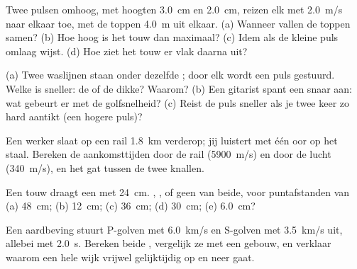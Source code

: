 \begin{exercise}[$\star\star$]\label{exo:g12:mechanical-waves:7}
Twee pulsen omhoog, met hoogten \qty{3.0}{cm} en \qty{2.0}{cm}, reizen
elk met \qty{2.0}{m/s} naar elkaar toe, met de toppen \qty{4.0}{m} uit
elkaar. (a) Wanneer vallen de toppen samen? (b) Hoe hoog is het touw dan
maximaal? (c) Idem als de kleine puls omlaag wijst. (d) Hoe ziet het touw
er vlak daarna uit?
\end{exercise}

\begin{exercise}[$\star\star$]\label{exo:g12:mechanical-waves:8}
(a) Twee waslijnen staan onder dezelfde ; door elk wordt een puls
gestuurd. Welke is sneller: de  of de dikke? Waarom? (b) Een
gitarist spant een snaar aan: wat gebeurt er met de golfsnelheid?
(c) Reist de puls sneller als je twee keer zo hard aantikt (een hogere
puls)?
\end{exercise}

\begin{exercise}[$\star\star$]\label{exo:g12:mechanical-waves:9}
Een werker slaat op een rail \qty{1.8}{km} verderop; jij luistert met één
oor op het staal. Bereken de aankomsttijden door de rail
(\qty{5900}{m/s}) en door de lucht (\qty{340}{m/s}), en het gat tussen de
twee knallen.
\end{exercise}

\begin{exercise}[$\star\star$]\label{exo:g12:mechanical-waves:10}
Een touw draagt een  met  \qty{24}{cm}. ,
, of geen van beide, voor puntafstanden van (a) \qty{48}{cm};
(b) \qty{12}{cm}; (c) \qty{36}{cm}; (d) \qty{30}{cm}; (e) \qty{6.0}{cm}?
\end{exercise}

\begin{exercise}[$\star\star$]\label{exo:g12:mechanical-waves:11}
Een aardbeving stuurt P-golven met \qty{6.0}{km/s} en S-golven met
\qty{3.5}{km/s} uit, allebei met  \qty{2.0}{s}. Bereken beide
, vergelijk ze met een gebouw, en verklaar waarom een hele wijk
vrijwel gelijktijdig op en neer gaat.
\end{exercise}

